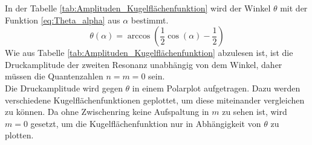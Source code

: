 \FloatBarrier
In der Tabelle \ref{tab:Amplituden_Kugelflächenfunktion} wird der Winkel $\theta$ mit der Funktion \eqref{eq:Theta_alpha} aus $\alpha$ bestimmt.
\begin{equation}
    \label{eq:Theta_alpha}
    \theta(\alpha) = \arccos\left( \frac{1}{2} \cos\left( \alpha \right) -\frac{1}{2} \right)
\end{equation}
Wie aus Tabelle \ref{tab:Amplituden_Kugelflächenfunktion} abzulesen ist, ist die Druckamplitude der zweiten Resonanz 
unabhängig von dem Winkel, daher müssen die Quantenzahlen $n=m=0$ sein.\\
Die Druckamplitude wird gegen $\theta$ in einem Polarplot aufgetragen. Dazu werden verschiedene Kugelflächenfunktionen 
geplottet, um diese miteinander vergleichen zu können. Da ohne Zwischenring keine Aufspaltung in $m$ zu sehen ist, wird $m=0$ gesetzt,
um die Kugelflächenfunktion nur in Abhängigkeit von $\theta$ zu plotten.
\FloatBarrier
